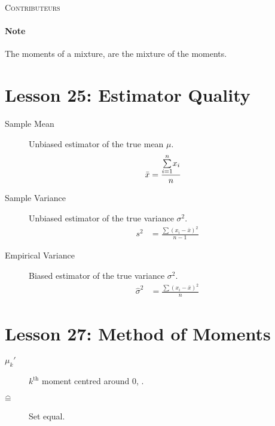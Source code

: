 \documentclass[10pt, french]{article}
\def\SectionColor{cobalt}
\begin{document}
\begin{center}
	\textsc{\Large Contributeurs}\\[0.5cm] 
\end{center}
%

\newpage
\raggedcolumns
\begin{multicols*}{2}

\paragraph{Note}	The moments of a mixture, are the mixture of the moments.

\def\SectionColor{red!80!white}
\section{Lesson 25: Estimator Quality}
\begin{distributions}
\begin{description}
	\item[Sample Mean]	Unbiased estimator of the true mean $\mu$.
\begin{align*}
	\bar{x}
	&=	\frac{\overset{n}{\underset{i = 1}{\sum}} x_{i}}{n}
\end{align*}
	\item[Sample Variance]	Unbiased estimator of the true variance $\sigma^{2}$.
\begin{align*}
	s^{2} 
	&=	\frac{\sum (x_{i} - \bar{x})^{2}}{n - 1}
\end{align*}
	\item[Empirical Variance]	Biased estimator of the true variance $\sigma^{2}$.
		\begin{align*}
		\hat{\sigma}^{2} 
		&=	\frac{\sum (x_{i} - \bar{x})^{2}}{n}
		\end{align*}
\end{description}
\end{distributions}

\section{Lesson 27: Method of Moments}
\begin{distributions}[Notation]
\begin{description}
	\item[$\mu_{k}'$]	$k^{\text{th}}$ moment centred around 0, .
	\item[$\equalhat$]	Set equal.
\end{description}
\end{distributions}


\end{multicols*}
\end{document}
